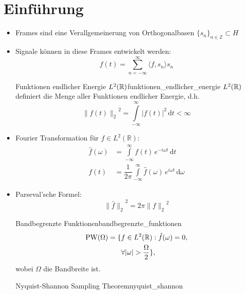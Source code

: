   \section{Einführung}
    \begin{itemize}
            \item Frames sind eine Verallgemeinerung von Orthogonalbasen $\{s_{n}\}_{n \in \mathbb{Z}} \subset H$
      \item Signale können in diese Frames entwickelt werden:
            \begin{equation*}
              f(t) = \sum\limits_{n=-\infty}^{\infty} \langle f, s_{n} \rangle s_{n}
            \end{equation*}
            \begin{boringDef}{Funktionen endlicher Energie $L^{2}(\mathbb{R})$}{funktionen_endlicher_energie}
            $L^{2}(\mathbb{R})$ definiert die Menge aller Funktionen endlicher Energie, d.h.\:
            \begin{equation*}
              {\|f(t)\|_{2}}^{2} = \int\limits_{-\infty}^{\infty} |f(t)|^{2}\,\mathrm{d}t < \infty
            \end{equation*}
            \end{boringDef}
      \item Fourier Transformation für $f \in L^{2}(\mathbb{R})$:
            \begin{align*}
              \hat{f}(\omega) &= \int\limits_{-\infty}^{\infty} f(t) \, e^{-i\omega t}\,\mathrm{d}t\\
              f(t) &= \dfrac{1}{2\pi} \int\limits_{-\infty}^{\infty} \hat{f}(\omega) \, e^{i\omega t}\,\mathrm{d}\omega
            \end{align*}
      \item Parseval'sche Formel:
            \begin{equation*}
              {\|\hat{f}\|_{2}}^{2} = 2\pi {\|f\|_{2}}^{2}
            \end{equation*}
            \begin{boringDef}{Bandbegrenzte Funktionen}{bandbegrenzte_funktionen}
              \begin{align*}
                \mathrm{PW}(\Omega) = \{&f \in L^{2}(\mathbb{R}): \hat{f}(\omega) = 0,\\
                &\forall|\omega| > \dfrac{\Omega}{2}\},
              \end{align*}
              wobei $\Omega$ die Bandbreite ist.
            \end{boringDef}
            \begin{mytheo}{Nyquist-Shannon Sampling Theorem}{nyquist_shannon}

\end{mytheo}
\end{itemize}
